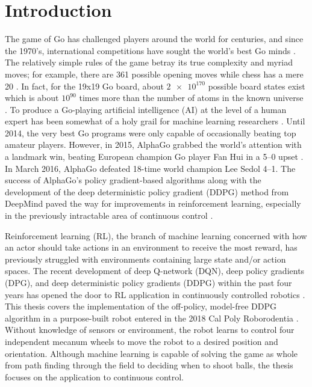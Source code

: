 \chapter{Introduction}
The game of Go has challenged players around the world for centuries, and since the 1970's, international competitions have sought the world's best Go minds \cite{go}. The relatively simple rules of the game betray its true complexity and myriad moves; for example, there are 361 possible opening moves while chess has a mere 20 \cite{brit_go}. In fact, for the 19x19 Go board, about $\num{2e170}$ possible board states exist which is about $10^{90}$ times more than the number of atoms in the known universe \cite{go_num}. To produce a Go-playing artificial intelligence (AI) at the level of a human expert has been somewhat of a holy grail for machine learning researchers \cite{brit_go2}. Until 2014, the very best Go programs were only capable of occasionally beating top amateur players. However, in 2015, AlphaGo grabbed the world's attention with a landmark win, beating European champion Go player Fan Hui in a 5--0 upset \cite{brit_go3}. In March 2016, AlphaGo defeated 18-time world champion Lee Sedol 4--1. The success of AlphaGo's policy gradient-based algorithms along with the development of the deep deterministic policy gradient (DDPG) method from DeepMind paved the way for improvements in reinforcement learning, especially in the previously intractable area of continuous control \cite{Mnih_2015}\cite{silver_2017}.

 Reinforcement learning (RL), the branch of machine learning concerned with how an actor should take actions in an environment to receive the most reward, has previously struggled with environments containing large state and/or action spaces. The recent  development of deep Q-network (DQN), deep policy gradients (DPG), and deep deterministic policy gradients (DDPG) within the past four years has opened the door to RL application in continuously controlled robotics  \cite{Mnih_2015}\cite{silver_lever_heess_degris_wierstra_riedmiller}\cite{lillicrap_2016}. This thesis covers the implementation of the off-policy, model-free DDPG algorithm in a purpose-built robot entered in the 2018 Cal Poly Roborodentia \cite{roborodentia}. Without knowledge of sensors or environment, the robot learns to control four independent mecanum wheels to move the robot to a desired position and orientation. Although machine learning is capable of solving the game as whole from path finding through the field to deciding when to shoot balls, the thesis focuses on the application to continuous control.
 
